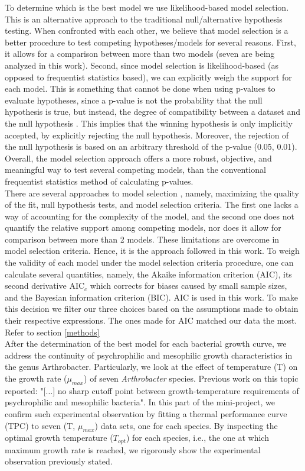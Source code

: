 \documentclass[titlepage,11pt]{article}
\begin{document}
\begin{linenumbers}
	To determine which is the best model we use likelihood-based model selection. This is an alternative approach to the traditional null/alternative hypothesis testing. When confronted with each other, we believe that model selection is a better procedure to test competing hypotheses/models for several reasons. First, it allows for a comparison between more than two models (seven are being analyzed in this work). Second, since model selection is likelihood-based (as opposed to frequentist statistics based), we can explicitly weigh the support for each model. This is something that cannot be done when using p-values to evaluate hypotheses, since a p-value is not the probability that the null hypothesis is true, but instead, the degree of compatibility between a dataset and the null hypothesis \cite{RonaldL.Wasserstein}. This implies that the winning hypothesis is only implicitly accepted, by explicitly rejecting the null hypothesis. Moreover, the rejection of the null hypothesis is based on an arbitrary threshold of the p-value (0.05, 0.01). Overall, the model selection approach offers a more robust, objective, and meaningful way to test several competing models, than the conventional frequentist statistics method of calculating p-values. \\
	There are several approaches to model selection \cite{Johnson2004}, namely,  maximizing the quality of the fit, null hypothesis tests, and model selection criteria. The first one lacks a way of accounting for the complexity of the model, and the second one does not quantify the relative support among competing models, nor does it allow for comparison between more than 2 models. These limitations are overcome in model selection criteria. Hence, it is the approach followed in this work.
	To weigh the validity of each model under the model selection criteria procedure, one can calculate several quantities, namely, the Akaike information criterion (AIC), its second derivative AIC$_c$ which corrects for biases caused by small sample sizes, and the Bayesian information criterion (BIC). AIC is used in this work. To make this decision we filter our three choices based on the assumptions made to obtain their respective expressions. The ones made for AIC matched our data the most. Refer to section \ref{methods} \\
	
	After the determination of the best model for each bacterial growth curve, we address the continuity of psychrophilic and mesophilic growth characteristics in the genus Arthrobacter. Particularly, we look at the effect of temperature (T) on the growth rate ($\mu_{max}$) of seven \textit{Arthrobacter} species. Previous work on this topic \cite{ROTH1962} reported: "[...] no sharp cutoff point between growth-temperature requirements of psychrophilic and mesophilic bacteria". In this part of the mini-project, we confirm such experimental observation by fitting a thermal performance curve (TPC) \cite{Lactin1995} to seven (T, $ \mu_{max} $) data sets, one for each species. By inspecting the optimal growth temperature ($ T_{opt} $) for each species, i.e., the one at which maximum growth rate is reached, we rigorously show the experimental observation previously stated.

\end{linenumbers}
\end{document}
